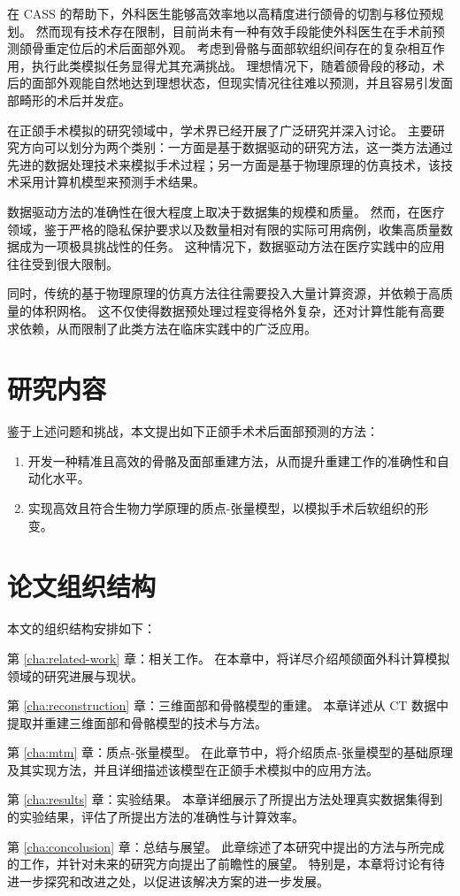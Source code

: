 在 CASS 的帮助下，外科医生能够高效率地以高精度进行颌骨的切割与移位预规划。
然而现有技术存在限制，目前尚未有一种有效手段能使外科医生在手术前预测颌骨重定位后的术后面部外观。
考虑到骨骼与面部软组织间存在的复杂相互作用，执行此类模拟任务显得尤其充满挑战。
理想情况下，随着颌骨段的移动，术后的面部外观能自然地达到理想状态，但现实情况往往难以预测，并且容易引发面部畸形的术后并发症。

在正颌手术模拟的研究领域中，学术界已经开展了广泛研究并深入讨论。
主要研究方向可以划分为两个类别：一方面是基于数据驱动的研究方法，这一类方法通过先进的数据处理技术来模拟手术过程；另一方面是基于物理原理的仿真技术，该技术采用计算机模型来预测手术结果。

数据驱动方法的准确性在很大程度上取决于数据集的规模和质量。
然而，在医疗领域，鉴于严格的隐私保护要求以及数量相对有限的实际可用病例，收集高质量数据成为一项极具挑战性的任务。
这种情况下，数据驱动方法在医疗实践中的应用往往受到很大限制。

同时，传统的基于物理原理的仿真方法往往需要投入大量计算资源，并依赖于高质量的体积网格。
这不仅使得数据预处理过程变得格外复杂，还对计算性能有高要求依赖，从而限制了此类方法在临床实践中的广泛应用。

\section{研究内容}

鉴于上述问题和挑战，本文提出如下正颌手术术后面部预测的方法：
\begin{enumerate}
  \item 开发一种精准且高效的骨骼及面部重建方法，从而提升重建工作的准确性和自动化水平。
  \item 实现高效且符合生物力学原理的质点-张量模型，以模拟手术后软组织的形变。
\end{enumerate}

\section{论文组织结构}

本文的组织结构安排如下：

第 \ref{cha:related-work} 章：相关工作。
在本章中，将详尽介绍颅颌面外科计算模拟领域的研究进展与现状。

第 \ref{cha:reconstruction} 章：三维面部和骨骼模型的重建。
本章详述从 CT 数据中提取并重建三维面部和骨骼模型的技术与方法。

第 \ref{cha:mtm} 章：质点-张量模型。
在此章节中，将介绍质点-张量模型的基础原理及其实现方法，并且详细描述该模型在正颌手术模拟中的应用方法。

第 \ref{cha:results} 章：实验结果。
本章详细展示了所提出方法处理真实数据集得到的实验结果，评估了所提出方法的准确性与计算效率。

第 \ref{cha:concolusion} 章：总结与展望。
此章综述了本研究中提出的方法与所完成的工作，并针对未来的研究方向提出了前瞻性的展望。
特别是，本章将讨论有待进一步探究和改进之处，以促进该解决方案的进一步发展。
